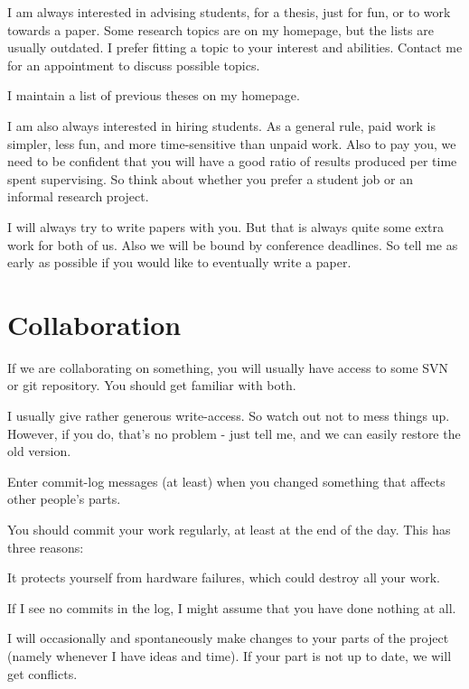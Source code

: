 \documentclass[12pt]{article}
\begin{document}
I am always interested in advising students, for a thesis, just for fun, or to work towards a paper.
Some research topics are on my homepage, but the lists are usually outdated.
I prefer fitting a topic to your interest and abilities.
Contact me for an appointment to discuss possible topics.
\medskip

I maintain a list of previous theses on my homepage.
\medskip

I am also always interested in hiring students.
As a general rule, paid work is simpler, less fun, and more time-sensitive than unpaid work.
Also to pay you, we need to be confident that you will have a good ratio of results produced per time spent supervising.
So think about whether you prefer a student job or an informal research project.
\medskip

I will always try to write papers with you.
But that is always quite some extra work for both of us.
Also we will be bound by conference deadlines.
So tell me as early as possible if you would like to eventually write a paper.

\section{Collaboration}

If we are collaborating on something, you will usually have access to some SVN or git repository. You should get familiar with both.
\medskip

I usually give rather generous write-access. So watch out not to mess things up. However, if you do, that's no problem - just tell me, and we can easily restore the old version.
\medskip

Enter commit-log messages (at least) when you changed something that affects other people's parts.
\medskip

You should commit your work regularly, at least at the end of the day. This has three reasons:
\begin{compactitem}
\item It protects yourself from hardware failures, which could destroy all your work.
\item If I see no commits in the log, I might assume that you have done nothing at all.
\item I will occasionally and spontaneously make changes to your parts of the project (namely whenever I have ideas and time). If your part is not up to date, we will get conflicts.
\end{compactitem}
\end{document}

